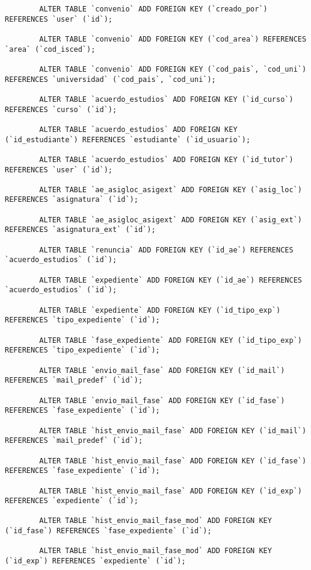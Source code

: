 \begin{verbatim}
		ALTER TABLE `convenio` ADD FOREIGN KEY (`creado_por`) REFERENCES `user` (`id`);
		
		ALTER TABLE `convenio` ADD FOREIGN KEY (`cod_area`) REFERENCES `area` (`cod_isced`);
		
		ALTER TABLE `convenio` ADD FOREIGN KEY (`cod_pais`, `cod_uni`) REFERENCES `universidad` (`cod_pais`, `cod_uni`);
		
		ALTER TABLE `acuerdo_estudios` ADD FOREIGN KEY (`id_curso`) REFERENCES `curso` (`id`);
		
		ALTER TABLE `acuerdo_estudios` ADD FOREIGN KEY (`id_estudiante`) REFERENCES `estudiante` (`id_usuario`);
		
		ALTER TABLE `acuerdo_estudios` ADD FOREIGN KEY (`id_tutor`) REFERENCES `user` (`id`);
		
		ALTER TABLE `ae_asigloc_asigext` ADD FOREIGN KEY (`asig_loc`) REFERENCES `asignatura` (`id`);
		
		ALTER TABLE `ae_asigloc_asigext` ADD FOREIGN KEY (`asig_ext`) REFERENCES `asignatura_ext` (`id`);
		
		ALTER TABLE `renuncia` ADD FOREIGN KEY (`id_ae`) REFERENCES `acuerdo_estudios` (`id`);
		
		ALTER TABLE `expediente` ADD FOREIGN KEY (`id_ae`) REFERENCES `acuerdo_estudios` (`id`);
		
		ALTER TABLE `expediente` ADD FOREIGN KEY (`id_tipo_exp`) REFERENCES `tipo_expediente` (`id`);
		
		ALTER TABLE `fase_expediente` ADD FOREIGN KEY (`id_tipo_exp`) REFERENCES `tipo_expediente` (`id`);
		
		ALTER TABLE `envio_mail_fase` ADD FOREIGN KEY (`id_mail`) REFERENCES `mail_predef` (`id`);
		
		ALTER TABLE `envio_mail_fase` ADD FOREIGN KEY (`id_fase`) REFERENCES `fase_expediente` (`id`);
		
		ALTER TABLE `hist_envio_mail_fase` ADD FOREIGN KEY (`id_mail`) REFERENCES `mail_predef` (`id`);
		
		ALTER TABLE `hist_envio_mail_fase` ADD FOREIGN KEY (`id_fase`) REFERENCES `fase_expediente` (`id`);
		
		ALTER TABLE `hist_envio_mail_fase` ADD FOREIGN KEY (`id_exp`) REFERENCES `expediente` (`id`);
		
		ALTER TABLE `hist_envio_mail_fase_mod` ADD FOREIGN KEY (`id_fase`) REFERENCES `fase_expediente` (`id`);
		
		ALTER TABLE `hist_envio_mail_fase_mod` ADD FOREIGN KEY (`id_exp`) REFERENCES `expediente` (`id`);
		

\end{verbatim}
